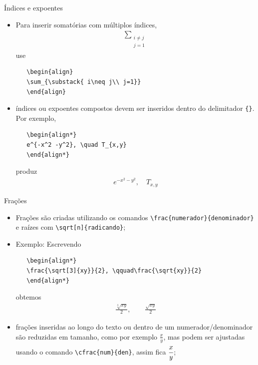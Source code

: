 \documentclass[c]{beamer}
\begin{document}
{\begin{frame}[fragile]{\sc Índices e expoentes}
	\begin{itemize}
		\setlength\itemsep{0.2cm}
    \item Para inserir somatórias com múltiplos índices,
   \begin{align}
   \sum_{\substack{ i\neq j\\ j=1}}
   \end{align}
   use 
   \begin{verbatim}
   \begin{align}
   \sum_{\substack{ i\neq j\\ j=1}}
   \end{align}   
   \end{verbatim}
   \item índices ou expoentes compostos devem ser inseridos dentro do 
   delimitador \verb|{}|. Por exemplo, 
   \begin{verbatim}
   \begin{align*}
   e^{-x^2 -y^2}, \quad T_{x,y}
   \end{align*}
   \end{verbatim}
   produz 
   \begin{align*}
   e^{-x^2 -y^2}, \quad T_{x,y}
   \end{align*}
	\end{itemize}
\end{frame}

\begin{frame}[fragile]{\sc Frações}
	\begin{itemize}
		\setlength\itemsep{0.3cm}
   \item {\color{blue} Frações} são criadas utilizando os comandos \verb|\frac{numerador}{denominador}| 
   e raízes com \verb|\sqrt[n]{radicando}|;
   \item Exemplo: Escrevendo
   \begin{verbatim}
   \begin{align*}
   \frac{\sqrt[3]{xy}}{2}, \qquad\frac{\sqrt{xy}}{2}
   \end{align*}
   \end{verbatim}
   obtemos 
   \begin{align*}
   \frac{\sqrt[3]{xy}}{2}, \qquad \frac{\sqrt{xy}}{2}
   \end{align*}
   \item {\color{blue} frações} inseridas ao longo do {\color{blue} texto} ou dentro de um numerador/denominador 
   são reduzidas em tamanho, como por exemplo $\frac{x}{y}$, mas podem ser ajustadas usando o comando \verb|\cfrac{num}{den}|, 
   assim fica $\cfrac{x}{y}$;
	\end{itemize}
\end{frame}
	


}
\end{document}
